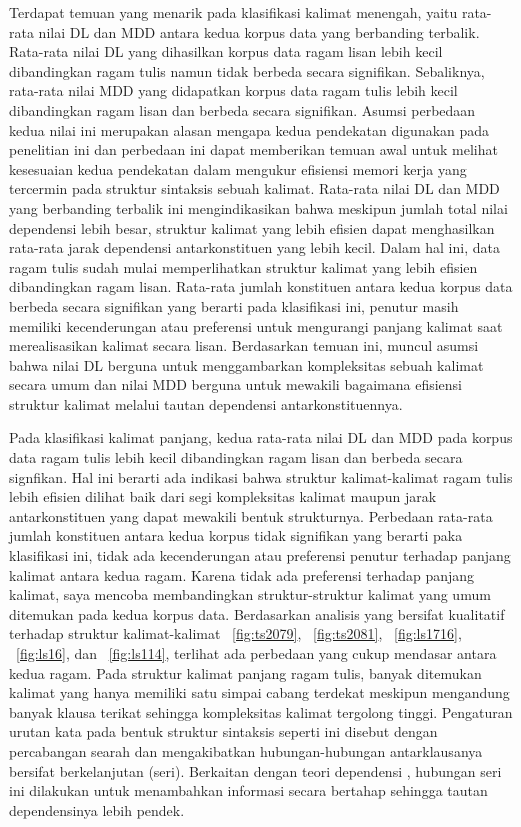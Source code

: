 
Terdapat temuan yang menarik pada klasifikasi kalimat menengah, yaitu rata-rata nilai DL dan MDD antara kedua korpus data yang berbanding terbalik. Rata-rata nilai DL yang dihasilkan korpus data ragam lisan lebih kecil dibandingkan ragam tulis namun tidak berbeda secara signifikan. Sebaliknya, rata-rata nilai MDD yang didapatkan korpus data ragam tulis lebih kecil dibandingkan ragam lisan dan berbeda secara signifikan. Asumsi perbedaan kedua nilai ini merupakan alasan mengapa kedua pendekatan digunakan pada penelitian ini dan perbedaan ini dapat memberikan temuan awal untuk melihat kesesuaian kedua pendekatan dalam mengukur efisiensi memori kerja yang tercermin pada struktur sintaksis sebuah kalimat. Rata-rata nilai DL dan MDD yang berbanding terbalik ini mengindikasikan bahwa meskipun jumlah total nilai dependensi lebih besar, struktur kalimat yang lebih efisien dapat menghasilkan rata-rata jarak dependensi antarkonstituen yang lebih kecil. Dalam hal ini, data ragam tulis sudah mulai memperlihatkan struktur kalimat yang lebih efisien dibandingkan ragam lisan. Rata-rata jumlah konstituen antara kedua korpus data berbeda secara signifikan yang berarti pada klasifikasi ini, penutur masih memiliki kecenderungan atau preferensi untuk mengurangi panjang kalimat saat merealisasikan kalimat secara lisan. Berdasarkan temuan ini, muncul asumsi bahwa nilai DL berguna untuk menggambarkan kompleksitas sebuah kalimat secara umum dan nilai MDD berguna untuk mewakili bagaimana efisiensi struktur kalimat melalui tautan dependensi antarkonstituennya.


Pada klasifikasi kalimat panjang, kedua rata-rata nilai DL dan MDD pada korpus data ragam tulis lebih kecil dibandingkan ragam lisan dan berbeda secara signfikan. Hal ini berarti ada indikasi bahwa struktur kalimat-kalimat ragam tulis lebih efisien dilihat baik dari segi kompleksitas kalimat maupun jarak antarkonstituen yang dapat mewakili bentuk strukturnya. Perbedaan rata-rata jumlah konstituen antara kedua korpus tidak signifikan yang berarti paka klasifikasi ini, tidak ada kecenderungan atau preferensi penutur terhadap panjang kalimat antara kedua ragam. Karena tidak ada preferensi terhadap panjang kalimat, saya mencoba membandingkan struktur-struktur kalimat yang umum ditemukan pada kedua korpus data. Berdasarkan analisis yang bersifat kualitatif terhadap struktur kalimat-kalimat \pic~\ref{fig:ts2079}, \pic~\ref{fig:ts2081}, \pic~\ref{fig:ls1716}, \pic~\ref{fig:ls16}, dan \pic~\ref{fig:ls114}, terlihat ada perbedaan yang cukup mendasar antara kedua ragam. Pada struktur kalimat panjang ragam tulis, banyak ditemukan kalimat yang hanya memiliki satu simpai cabang terdekat meskipun mengandung banyak klausa terikat sehingga kompleksitas kalimat tergolong tinggi. Pengaturan urutan kata pada bentuk struktur sintaksis seperti ini disebut dengan percabangan searah dan mengakibatkan hubungan-hubungan antarklausanya bersifat berkelanjutan (seri). Berkaitan dengan teori dependensi \citep{tesniere1959elements, hawkins2014cross, gildea2010grammars}, hubungan seri ini dilakukan untuk menambahkan informasi secara bertahap sehingga tautan dependensinya lebih pendek. 

